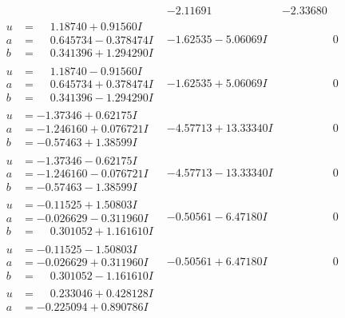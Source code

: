 \documentclass[1p]{elsarticle_modified}
\theoremstyle{definition}
\begin{document}
$$\begin{array}{c|c|c}
 & -2.11691\phantom{ +0.000000I} & -2.33680\phantom{ +0.000000I} \\ \hline\begin{aligned}
u &= \phantom{-}1.18740 + 0.91560 I \\
a &= \phantom{-}0.645734 - 0.378474 I \\
b &= \phantom{-}0.341396 + 1.294290 I\end{aligned}
 & -1.62535 - 5.06069 I & \phantom{-0.000000 } 0 \\ \hline\begin{aligned}
u &= \phantom{-}1.18740 - 0.91560 I \\
a &= \phantom{-}0.645734 + 0.378474 I \\
b &= \phantom{-}0.341396 - 1.294290 I\end{aligned}
 & -1.62535 + 5.06069 I & \phantom{-0.000000 } 0 \\ \hline\begin{aligned}
u &= -1.37346 + 0.62175 I \\
a &= -1.246160 + 0.076721 I \\
b &= -0.57463 + 1.38599 I\end{aligned}
 & -4.57713 + 13.33340 I & \phantom{-0.000000 } 0 \\ \hline\begin{aligned}
u &= -1.37346 - 0.62175 I \\
a &= -1.246160 - 0.076721 I \\
b &= -0.57463 - 1.38599 I\end{aligned}
 & -4.57713 - 13.33340 I & \phantom{-0.000000 } 0 \\ \hline\begin{aligned}
u &= -0.11525 + 1.50803 I \\
a &= -0.026629 - 0.311960 I \\
b &= \phantom{-}0.301052 + 1.161610 I\end{aligned}
 & -0.50561 - 6.47180 I & \phantom{-0.000000 } 0 \\ \hline\begin{aligned}
u &= -0.11525 - 1.50803 I \\
a &= -0.026629 + 0.311960 I \\
b &= \phantom{-}0.301052 - 1.161610 I\end{aligned}
 & -0.50561 + 6.47180 I & \phantom{-0.000000 } 0 \\ \hline\begin{aligned}
u &= \phantom{-}0.233046 + 0.428128 I \\
a &= -0.225094 + 0.890786 I \\

\end{aligned}
\end{array}$$
\end{document}
